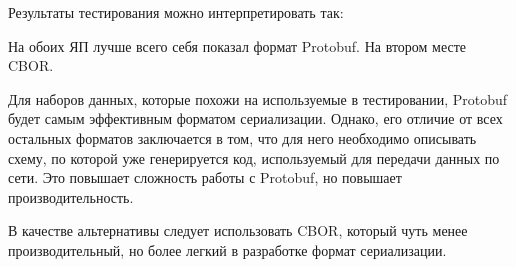 Результаты тестирования можно интерпретировать так:   

На обоих ЯП лучше всего себя показал формат Protobuf. 
На втором месте CBOR.  

Для наборов данных, которые похожи на используемые в тестировании,  Protobuf будет самым эффективным форматом сериализации. Однако, его отличие от всех остальных форматов заключается в том, что для него необходимо описывать схему, по которой уже генерируется код, используемый для передачи данных по сети.   
Это повышает сложность работы с Protobuf, но повышает производительность.  

В качестве альтернативы следует использовать CBOR, который чуть менее производительный, но более легкий в разработке формат сериализации.



